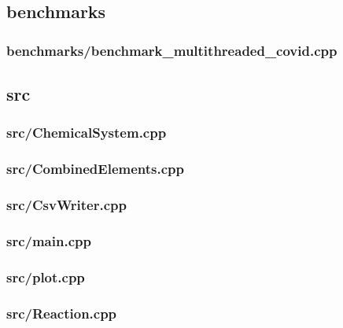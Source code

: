 \subsection{benchmarks}
\subsubsection{benchmarks/benchmark\_multithreaded\_covid.cpp}

\newpage
\subsection{src}
\subsubsection{src/ChemicalSystem.cpp}

\newpage
\subsubsection{src/CombinedElements.cpp}

\newpage
\subsubsection{src/CsvWriter.cpp}

\newpage
\subsubsection{src/main.cpp}

\newpage
\subsubsection{src/plot.cpp}

\newpage
\subsubsection{src/Reaction.cpp}

\newpage
